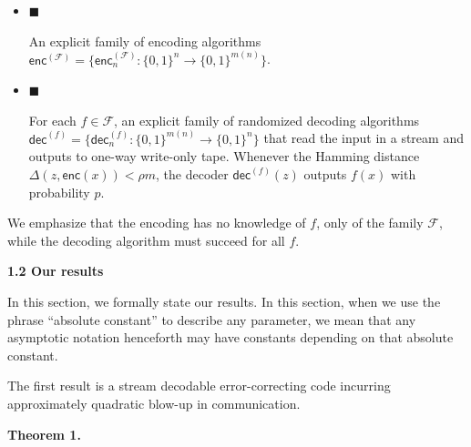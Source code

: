 \begin{itemize}


\item[] 
$\blacksquare$ 


An explicit family of encoding algorithms $\mathsf{enc}^{(\mathcal{F})}=\{\mathsf{enc}^{(\mathcal{F})}_{n}:\{0,1\}^{n}\rightarrow\{0,1\}^{m(n)}\}$.\par





\item[] 
$\blacksquare$ 


For each $f\in\mathcal{F}$, an explicit family of randomized decoding algorithms $\mathsf{dec}^{(f)}=\{\mathsf{dec}^{(f)}_{n}:\{0,1\}^{m(n)}\rightarrow\{0,1\}^{n}\}$ that read the input in a stream and outputs to one-way write-only tape. Whenever the Hamming distance $\Delta(z,\mathsf{enc}(x))<\rho m$, the decoder $\mathsf{dec}^{(f)}(z)$ outputs $f(x)$ with probability $p$.\par





\end{itemize}


We emphasize that the encoding has no knowledge of $f$, only of the family $\mathcal{F}$, while the decoding algorithm must succeed for all $f$.\par





\par\medskip\noindent\textbf{
1.2 Our results}\par




In this section, we formally state our results. In this section, when we use the phrase “absolute constant” to describe any parameter, we mean that any asymptotic notation henceforth may have constants depending on that absolute constant.\par




The first result is a stream decodable error-correcting code incurring approximately quadratic blow-up in communication.\par





\par\medskip\noindent\textbf{
\textbf{Theorem 1}\textbf{.}
}\par



